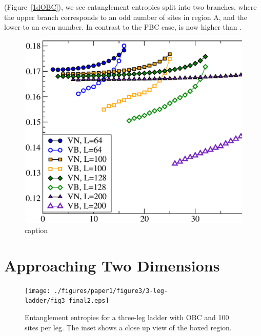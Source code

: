  (Figure~\ref{1dOBC}), we see entanglement entropies split into two branches, where the upper branch corresponds to an odd number of sites in region A, and the lower to an even number.
In contrast to the PBC case, \vb is now higher than \vn.

\begin{figure} {
\includegraphics[width=6in]{./figures/paper1/figure1/fig2_NEW.eps} 
\centering
\caption[caption]{ 
	caption
}}
\end{figure}


\section{Approaching Two Dimensions}

 
\begin{figure} { \texttt{[image: ./figures/paper1/figure3/3-leg-ladder/fig3\_final2.eps]}
\caption[Entanglement entropies for a three-leg ladder]{
Entanglement entropies for a three-leg ladder with OBC and 100 sites per leg.  
The inset shows a close up view of the boxed region.
 \label{ladder3} }} 
 \end{figure}
 
